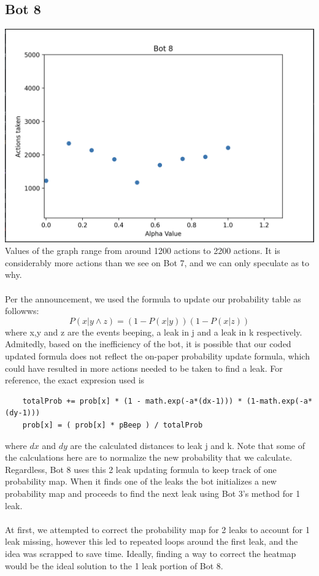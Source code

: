 \documentclass[12pt]{article}
\begin{document}
\subsection*{Bot 8}
\includegraphics*[scale=0.65]{Bot8}
Values of the graph range from around 1200 actions to 2200 actions. It is considerably more actions than 
we see on Bot 7, and we can only speculate as to why. 
\\
\\
Per the announcement, we used the formula to update our probability table as followws:
\[
P(x | y \land z) = (1 - P(x | y))(1-  P(x | z))
\] 
where x,y and z are the events beeping, a leak in j and a leak in k respectively. Admitedly, based on 
the inefficiency of the bot, it is possible that our coded updated formula does not reflect the on-paper 
probability update formula, which could have resulted in more actions needed to be taken to find a leak. 
For reference, the exact expresion used is 
\begin{lstlisting}
    totalProb += prob[x] * (1 - math.exp(-a*(dx-1))) * (1-math.exp(-a*(dy-1)))
    prob[x] = ( prob[x] * pBeep ) / totalProb
\end{lstlisting}
where $dx$ and $dy$ are the calculated distances to leak j and k. Note that some of the calculations 
here are to normalize the new probability that we calculate. Regardless, Bot 8 uses this 
2 leak updating formula to keep track of one probability map. When it finds one of the leaks
the bot initializes a new probability map and proceeds to find the next leak using Bot 3's method for 1 leak. 
\\
\\
At first, we attempted to correct the probability map for 2 leaks to account for 1 leak missing, 
however this led to repeated loops around the first leak, and the idea was scrapped to save time. Ideally, 
finding a way to correct the heatmap would be the ideal solution to the 1 leak portion of Bot 8. 
\end{document}
